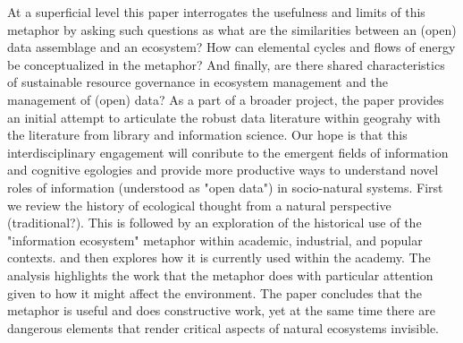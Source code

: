 At a superficial level this paper interrogates the usefulness and limits of this metaphor by asking such questions as what are the similarities between an (open) data assemblage \cite{kitchin_2014} and an ecosystem? How can elemental cycles and flows of energy be conceptualized in the metaphor? And finally, are there shared characteristics of sustainable resource governance in ecosystem management and the management of (open) data? As a part of a broader project, the paper provides an initial attempt to articulate the robust data literature within geograhy with the literature from library and information science. Our hope is that this interdisciplinary engagement will conribute to the emergent fields of information and cognitive egologies and provide more productive ways to understand novel roles of information (understood as "open data") in socio-natural systems. First we review the history of ecological thought from a natural perspective (traditional?). This is followed by an exploration of the historical use of the "information ecosystem" metaphor within academic, industrial, and popular contexts. and then explores how it is currently used within the academy. The analysis highlights the work that the metaphor does with particular attention given to how it might affect the environment. The paper concludes that the metaphor is useful and does constructive work, yet at the same time there are dangerous elements that render critical aspects of natural ecosystems invisible.
